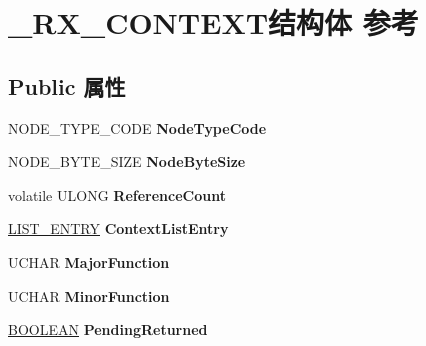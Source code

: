 \hypertarget{struct___r_x___c_o_n_t_e_x_t}{}\section{\+\_\+\+R\+X\+\_\+\+C\+O\+N\+T\+E\+X\+T结构体 参考}
\label{struct___r_x___c_o_n_t_e_x_t}
\subsection*{Public 属性}
\begin{DoxyCompactItemize}
\item 
\mbox{\label{struct___r_x___c_o_n_t_e_x_t_ac391b08af7d1002ec73f31317e9de0f4}} 
N\+O\+D\+E\+\_\+\+T\+Y\+P\+E\+\_\+\+C\+O\+DE {\bfseries Node\+Type\+Code}
\item 
\mbox{\label{struct___r_x___c_o_n_t_e_x_t_aee35df35ca0e43e0abf9a8ec7d083e4e}} 
N\+O\+D\+E\+\_\+\+B\+Y\+T\+E\+\_\+\+S\+I\+ZE {\bfseries Node\+Byte\+Size}
\item 
\mbox{\label{struct___r_x___c_o_n_t_e_x_t_a82efc91370ee068bf0df087851badb7d}} 
volatile U\+L\+O\+NG {\bfseries Reference\+Count}
\item 
\mbox{\label{struct___r_x___c_o_n_t_e_x_t_a6015317493a4104f2c1d283f0fd35a12}} 
\hyperlink{struct___l_i_s_t___e_n_t_r_y}{L\+I\+S\+T\+\_\+\+E\+N\+T\+RY} {\bfseries Context\+List\+Entry}
\item 
\mbox{\label{struct___r_x___c_o_n_t_e_x_t_a8386912ed02d9766f31aa227306e69e6}} 
U\+C\+H\+AR {\bfseries Major\+Function}
\item 
\mbox{\label{struct___r_x___c_o_n_t_e_x_t_ab30cff6c17c28f96a9a256f24494b511}} 
U\+C\+H\+AR {\bfseries Minor\+Function}
\item 
\mbox{\label{struct___r_x___c_o_n_t_e_x_t_a7bb2b9e16830c5a559e48228f6af6be9}} 
\hyperlink{_processor_bind_8h_a112e3146cb38b6ee95e64d85842e380a}{B\+O\+O\+L\+E\+AN} {\bfseries Pending\+Returned}
\item 
\mbox{\label{struct___r_x___c_o_n_t_e_x_t_a61c8c47e00bd01199338143ed192046b}} 

\end{DoxyCompactItemize}
